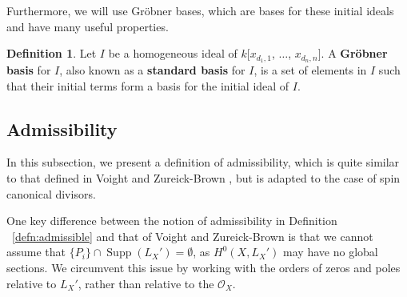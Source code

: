 \documentclass{amsart}
\theoremstyle{plain}
\theoremstyle{definition}
\newtheorem{defn}[thm]{Definition}
\theoremstyle{remark}
\numberwithin{equation}{section}
\newcommand\ssec{\subsection}
\newcommand\sco{{\mathscr O}}
\DeclareMathOperator{\Supp}{Supp}
\begin{document}
Furthermore, we will use Gr\"{o}bner bases, which are bases
for these initial ideals and have many useful properties.

\begin{defn}
\label{defn:grobner-basis}
Let $I$ be a homogeneous ideal of $k[x_{d_1, 1}$, $\ldots$,
$x_{d_n, n}]$. A \textbf{Gr\"obner basis} for $I$, also known as a
\textbf{standard basis} for $I$, is a set of elements in $I$
such that their initial terms form a basis for the initial
ideal of $I$.
\end{defn}

\ssec{Admissibility}

In this subsection, we present a definition of admissibility, which is quite similar to that defined in Voight and Zureick-Brown \cite[Definition 8.5.1]{vzb:stacky}, but is adapted to the case of spin canonical divisors.

One key difference between the notion of admissibility in Definition ~\ref{defn:admissible} and that of Voight and Zureick-Brown \cite[Definition 8.5.1]{vzb:stacky} is that 
	we cannot assume that $\{P_i\} \cap \Supp(L_X') = \emptyset$, as $H^0(X, L_X')$ may have no global sections. We circumvent this issue by working with the orders of zeros and poles relative to $L_X'$, rather than relative to the $\sco_X$.
\end{document}
